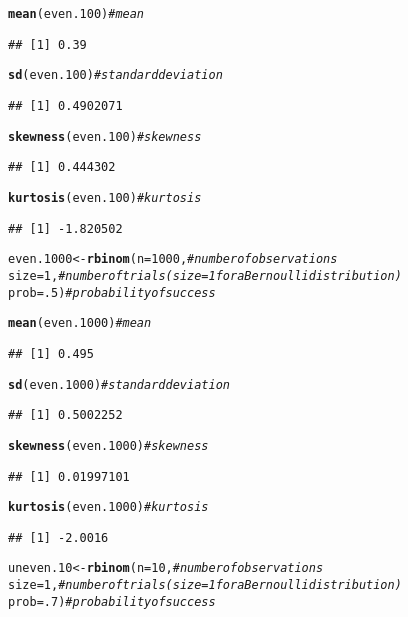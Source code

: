 \documentclass{article}\usepackage[]{graphicx}\usepackage[]{color}
\makeatletter
\newcommand{\hlnum}[1]{\textcolor[rgb]{0.686,0.059,0.569}{#1}}%
\newcommand{\hlcom}[1]{\textcolor[rgb]{0.678,0.584,0.686}{\textit{#1}}}%
\newcommand{\hlstd}[1]{\textcolor[rgb]{0.345,0.345,0.345}{#1}}%
\newcommand{\hlkwb}[1]{\textcolor[rgb]{0.69,0.353,0.396}{#1}}%
\newcommand{\hlkwc}[1]{\textcolor[rgb]{0.333,0.667,0.333}{#1}}%
\newcommand{\hlkwd}[1]{\textcolor[rgb]{0.737,0.353,0.396}{\textbf{#1}}}%
\newenvironment{kframe}{%
 \def\at@end@of@kframe{}%
 \ifinner\ifhmode%
  \def\at@end@of@kframe{\end{minipage}}%
  \begin{minipage}{\columnwidth}%
 \fi\fi%
 \def\FrameCommand##1{\hskip\@totalleftmargin \hskip-\fboxsep
 \colorbox{shadecolor}{##1}\hskip-\fboxsep
     \hskip-\linewidth \hskip-\@totalleftmargin \hskip\columnwidth}%
 \MakeFramed {\advance\hsize-\width
   \@totalleftmargin\z@ \linewidth\hsize
   \@setminipage}}%
 {\par\unskip\endMakeFramed%
 \at@end@of@kframe}
\newenvironment{knitrout}{}{} %
\makeatother
\begin{document}
\begin{enumerate}
\begin{enumerate}
\begin{knitrout}
\begin{kframe}
\begin{alltt}
\hlkwd{mean}\hlstd{(even.100)}                   \hlcom{#mean}
\end{alltt}
\begin{verbatim}
## [1] 0.39
\end{verbatim}
\begin{alltt}
\hlkwd{sd}\hlstd{(even.100)}                     \hlcom{#standard deviation}
\end{alltt}
\begin{verbatim}
## [1] 0.4902071
\end{verbatim}
\begin{alltt}
\hlkwd{skewness}\hlstd{(even.100)}               \hlcom{#skewness}
\end{alltt}
\begin{verbatim}
## [1] 0.444302
\end{verbatim}
\begin{alltt}
\hlkwd{kurtosis}\hlstd{(even.100)}               \hlcom{#kurtosis}
\end{alltt}
\begin{verbatim}
## [1] -1.820502
\end{verbatim}
\begin{alltt}
\hlstd{even.1000} \hlkwb{<-} \hlkwd{rbinom}\hlstd{(}\hlkwc{n}\hlstd{=}\hlnum{1000}\hlstd{,}      \hlcom{#number of observations}
              \hlkwc{size}\hlstd{=}\hlnum{1}\hlstd{,}            \hlcom{#number of trials (size=1 for a Bernoulli distribution)}
              \hlkwc{prob}\hlstd{=}\hlnum{.5}\hlstd{)}           \hlcom{#probability of success}

\hlkwd{mean}\hlstd{(even.1000)}                  \hlcom{#mean}
\end{alltt}
\begin{verbatim}
## [1] 0.495
\end{verbatim}
\begin{alltt}
\hlkwd{sd}\hlstd{(even.1000)}                    \hlcom{#standard deviation}
\end{alltt}
\begin{verbatim}
## [1] 0.5002252
\end{verbatim}
\begin{alltt}
\hlkwd{skewness}\hlstd{(even.1000)}              \hlcom{#skewness}
\end{alltt}
\begin{verbatim}
## [1] 0.01997101
\end{verbatim}
\begin{alltt}
\hlkwd{kurtosis}\hlstd{(even.1000)}              \hlcom{#kurtosis}
\end{alltt}
\begin{verbatim}
## [1] -2.0016
\end{verbatim}
\begin{alltt}
\hlstd{uneven.10} \hlkwb{<-} \hlkwd{rbinom}\hlstd{(}\hlkwc{n}\hlstd{=}\hlnum{10}\hlstd{,}        \hlcom{#number of observations}
                  \hlkwc{size}\hlstd{=}\hlnum{1}\hlstd{,}        \hlcom{#number of trials (size=1 for a Bernoulli distribution)}
                  \hlkwc{prob}\hlstd{=}\hlnum{.7}\hlstd{)}       \hlcom{#probability of success}


\end{alltt}
\end{kframe}
\end{knitrout}
\end{enumerate}
\end{enumerate}
\end{document}
